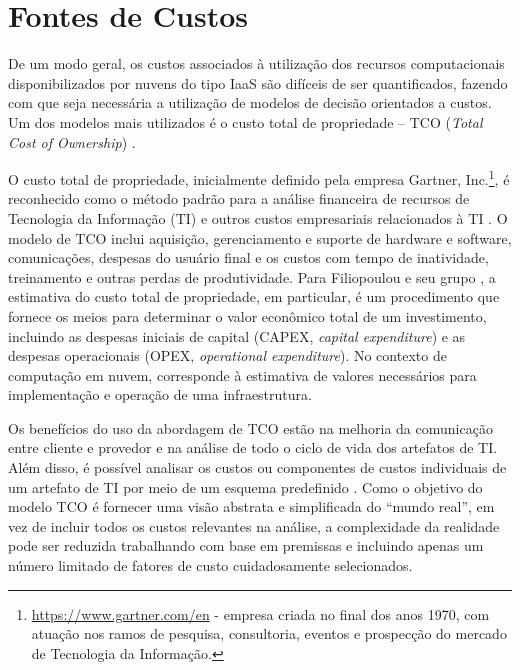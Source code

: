 \documentclass[tese,capa]{texufpel}
\begin{document}
\section{Fontes de Custos}\label{sec:fontes_de_custos}

De um modo geral, os custos associados à utilização dos recursos computacionais disponibilizados por nuvens do tipo IaaS são difíceis de ser quantificados, fazendo com que seja necessária a utilização de modelos de decisão orientados a custos. Um dos modelos mais utilizados é o custo total de propriedade -- TCO (\emph{Total Cost of Ownership}) \cite{strebelEconomicDecisionModel2010}.

O custo total de propriedade, inicialmente definido pela empresa Gartner, Inc.\footnote{\url{https://www.gartner.com/en} - empresa criada no final dos anos 1970, com atuação nos ramos de pesquisa, consultoria, eventos e prospecção do mercado de Tecnologia da Informação.}, é reconhecido como o método padrão para a análise financeira de recursos de Tecnologia da Informação (TI) e outros custos empresariais relacionados à TI \cite{mieritzDefiningGartnerTotal2005}. O modelo de TCO inclui aquisição, gerenciamento e suporte de hardware e software, comunicações, despesas do usuário final e os custos com tempo de inatividade, treinamento e outras perdas de produtividade. Para Filiopoulou e seu grupo \cite{filiopoulouIntegratingCostAnalysis2015}, a estimativa do custo total de propriedade, em particular, é um procedimento que fornece os meios para determinar o valor econômico total de um investimento, incluindo as despesas iniciais de capital (CAPEX, \emph{capital expenditure}) e as despesas operacionais (OPEX, \emph{operational expenditure}). No contexto de computação em nuvem, corresponde à estimativa de valores necessários para implementação e operação de uma infraestrutura.

Os benefícios do uso da abordagem de TCO estão na melhoria da comunicação entre cliente e provedor e na análise de todo o ciclo de vida dos artefatos de TI. Além disso, é possível analisar os custos ou componentes de custos individuais de um artefato de TI por meio de um esquema predefinido \cite{walterbuschEvaluatingCloudComputing2013}. Como o objetivo do modelo TCO é fornecer uma visão abstrata e simplificada do ``mundo real'', em vez de incluir todos os custos relevantes na análise, a complexidade da realidade pode ser reduzida trabalhando com base em premissas e incluindo apenas um número limitado de fatores de custo cuidadosamente selecionados.
\end{document}
